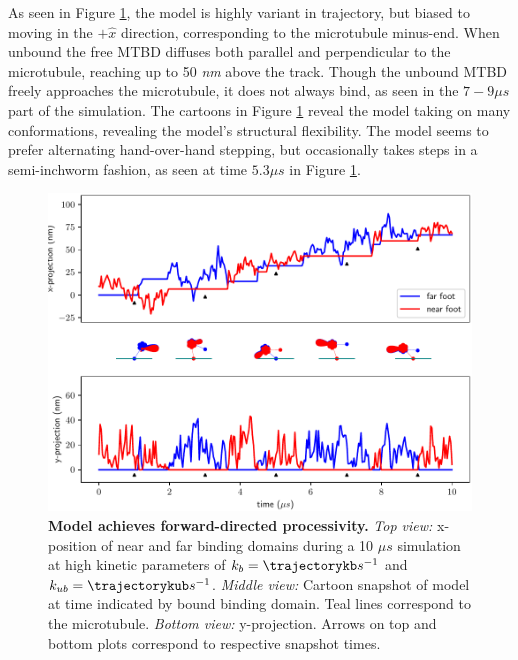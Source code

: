 \documentclass[9pt,twocolumn,twoside]{pnas-new}
\begin{document}
  As seen in Figure \ref{fig:trajectory}, the model is highly variant in trajectory, but biased to moving in the $+\hat{x}$ direction, corresponding to the microtubule minus-end. When unbound the free MTBD diffuses both parallel and perpendicular to the microtubule, reaching up to 50 \textit{nm} above the track. Though the unbound MTBD freely approaches the microtubule, it does not always bind, as seen in the $7-9 \mu s$ part of the simulation. The cartoons in Figure \ref{fig:trajectory} reveal the model taking on many conformations, revealing the model's structural flexibility. The model seems to prefer alternating hand-over-hand stepping, but occasionally takes steps in a semi-inchworm fashion, as seen at time $5.3 \mu s$ in Figure \ref{fig:trajectory}.\\

\begin{figure}[tbhp]
\centering
\includegraphics[width=\linewidth]{../../plots/paper_trajectory_plot.pdf}
\caption{\textbf{Model achieves forward-directed processivity.} \textit{Top view:} x-position of near and far binding domains during a 10 $\mu s$ simulation at high kinetic parameters of $k_b = \trajectorykb s^{-1}$ and $k_{ub} = \trajectorykub s^{-1}$. \textit{Middle view:} Cartoon snapshot of model at time indicated by bound binding domain. Teal lines correspond to the microtubule. \textit{Bottom view:} y-projection. Arrows on top and bottom plots correspond to respective snapshot times.}
\label{fig:trajectory}
\end{figure}
\end{document}
